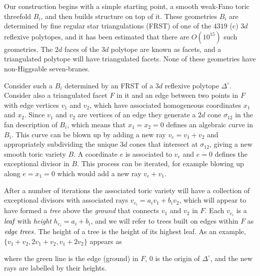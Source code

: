 \documentclass[aps,prl,twocolumn, superscriptaddress,groupedaddress,nofootinbib]{revtex4-1}
\begin{document}
Our construction  begins with a simple starting point, a smooth weak-Fano toric threefold
$B_i$, and then builds structure on top of it. These geometries $B_i$ are 
determined by
fine regular star triangulations (FRST) of one of the $4319$ (c) $3d$
reflexive polytopes, and it has been estimated \cite{Halverson:2016tve} that there are $O(10^{15})$ such geometries. The $2d$ faces of the $3d$ polytope are known
as facets, and a triangulated polytope will have triangulated facets. 
None of these geometries have non-Higgsable seven-branes.

Consider such a $B_i$ determined by an FRST of a $3d$ reflexive polytope $\Delta^\circ$. Consider also a triangulated facet
$F$ 
in it and an edge between two points in $F$ with
edge vertices $v_1$ and $v_2$, which have associated homogeneous
coordinates $x_1$ and $x_2$. Since  $v_1$ and $v_2$
are vertices of an edge they generate a $2d$ cone $\sigma_{12}$
in the
fan description of $B_i$, which means that $x_1=x_2=0$
defines an algebraic curve in $B_i$. This curve can be blown up by adding a new ray $v_e=v_1+v_2$ and appropriately subdividing the unique $3d$
cones that intersect at $\sigma_{12}$, giving a new smooth
toric variety $B$. A
coordinate $e$ is associated to $v_e$ and $e=0$ defines the
exceptional divisor in $B$. This process can be iterated,
for example blowing up along $e=x_1=0$ which would add a new
ray $v_e+v_1$. 

After a number of iterations the associated toric variety will have
a collection of exceptional divisors with associated rays
$v_{e_i}=a_i v_1 + b_i v_2$, which will appear to have formed
a \emph{tree} above the \emph{ground} that connects $v_1$ and
$v_2$ in $F$. Each $v_{e_i}$ is a $\emph{leaf}$ with
\emph{height} $h_{e_i}=a_i+b_i$, and 
we will refer to trees built on edges within $F$ as
$\emph{edge trees}$. The height of a tree is the height of
its highest leaf. As an example,
$\{v_1+v_2,2v_1+v_2,v_1+2v_2\}$ appears as
\begin{center}
\end{center}
where the green line is the edge (ground)
in $F$, $0$ is the origin of $\Delta^\circ$, and
the new rays are labelled by their heights.
\end{document}
